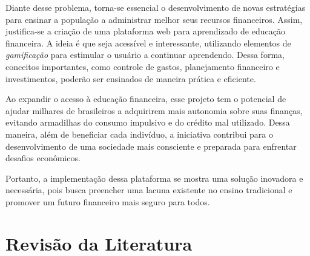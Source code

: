\documentclass[
	article,			%
	12pt,				%
	oneside,			%
	a4paper,			%
	english,			%
	brazil,				%
	sumario=tradicional
	]{abntex2}
\begin{document}
    

    Diante desse problema, torna-se essencial o desenvolvimento de novas estratégias para ensinar a população a administrar melhor seus recursos financeiros. Assim, justifica-se a criação de uma plataforma web para aprendizado de educação financeira. A ideia é que seja acessível e interessante, utilizando elementos de \textit{gamificação} para estimular o usuário a continuar aprendendo. Dessa forma, conceitos importantes, como controle de gastos, planejamento financeiro e investimentos, poderão ser ensinados de maneira prática e eficiente.

    Ao expandir o acesso à educação financeira, esse projeto tem o potencial de ajudar milhares de brasileiros a adquirirem mais autonomia sobre suas finanças, evitando armadilhas do consumo impulsivo e do crédito mal utilizado. Dessa maneira, além de beneficiar cada indivíduo, a iniciativa contribui para o desenvolvimento de uma sociedade mais consciente e preparada para enfrentar desafios econômicos.

    Portanto, a implementação dessa plataforma se mostra uma solução inovadora e necessária, pois busca preencher uma lacuna existente no ensino tradicional e promover um futuro financeiro mais seguro para todos.
    

\section{Revisão da Literatura}

\begin{comment}

Especial atenção ao que este capítulo deve conter:
    \begin{citacao}
    "Revisão bibliográfica, conforme já comentado, não produz conhecimento novo, mas apenas supre as
    deficiências de conhecimento que o pesquisador tem em uma determinada área. Portanto, ela deve ser muito
    bem planejada e conduzida.
    (...)
    Quando se faz uma pesquisa em que alguma técnica de computação é aplicada a alguma outra área do
    conhecimento, é necessário que se faça a revisão bibliográfica sobre a técnica em si, sobre a área de aplicação e,
    mais do que tudo, sobre as aplicações que já foram tentadas com essa técnica ou com técnicas semelhantes na
    mesma área ou em áreas equivalentes. Exemplificando, um aluno pretende desenvolver um sistema
    multiagentes para auxiliar controladores de voo. Esse aluno deve conhecer profundamente os sistemas
    multiagentes e deverá conhecer também os problemas que os controladores de voo enfrentam para exercer sua
    profissão. Porém, ele não deve pensar, como algumas vezes acontece, que essa é a primeira vez que alguém vai
    tentar desenvolver um sistema multiagentes para esse tipo de aplicação."
    \cite{PESQUISA:RAUL}.
    \end{citacao}

Toda a revisão da literatura deve ser basear primordialmente em livros e artigos científicos ranqueados Qualis CAPES. De forma geral, todo parágrafo deve conter AO MENOS uma citação bibliográfica.

\end{comment}
\end{document}
